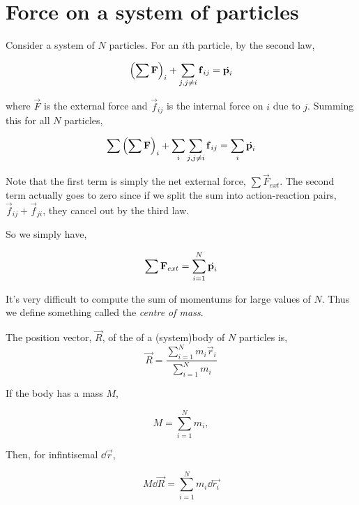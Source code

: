 \section{Force on a system of particles}

Consider a system of \(N\) particles. For an \(i\)th particle, by the second law,

\begin{equation*}
    \qty(\sum \mathbf{F})_i + \sum_{j, j \ne i} \boldsymbol{\mathbf{f}}_{ij} = \dot{\boldsymbol{\mathbf{p}}_i}
\end{equation*}

where \(\Vec{F}\) is the external force and \(\vec{f}_{ij}\) is the internal force
on \(i\) due to \(j\). Summing this for all \(N\) particles, 

\begin{equation*}
    \sum\qty(\sum \mathbf{F})_i + \sum_{i}\sum_{j, j \ne i} \boldsymbol{\mathbf{f}}_{ij} = \sum_i\dot{\boldsymbol{\mathbf{p}}_i}
\end{equation*}

Note that the first term is simply the net external force, \(\sum\Vec{F}_{ext}\). The second 
term actually goes to zero since if we split the sum into action-reaction pairs,
\(\vec{f}_{ij} + \vec{f}_{ji}\), they cancel out by the third law. 

So we simply have, 

\begin{equation*}
    \sum \mathbf{F}_{ext} = \sum_{i=1}^N\dot{\boldsymbol{\mathbf{p}}_i}
\end{equation*}

It's very difficult to compute the sum of momentums for large values of \(N\). Thus
we define something called the \emph{centre of mass}.

\begin{definition}
    \label{def: com}
    The position vector, \(\Vec{R}\), of the  of a (system)body of \(N\) particles is,
    \begin{equation}
        \Vec{R} = \frac{\sum_{i=1}^N m_i\vec{r}_i}{\sum_{i=1}^N m_i}
    \end{equation} 
\end{definition}

If the body has a mass \(M\), 

\[M = \sum_{i=1}^N m_i,\]

Then, for infintisemal \(\dd{\vec{r}}\), 

\begin{equation*}
    M\dd{\vec{R}} = \sum_{i=1}^N m_i\dd{\vec{r_i}}
\end{equation*}

